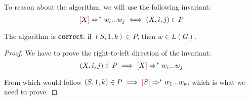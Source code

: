 \documentclass[main.tex]{subfiles}
\begin{document}
To reason about the algorithm, we will use the following invariant:
\begin{equation}
    \textcolor{red}{[} X \textcolor{red}{]} \Rightarrow^* w_i ... w_j \iff (X, i, j) \in P
\end{equation}

\begin{prop}
    The algorithm is \textbf{correct}: if $(S, 1, k) \in P$, then $w \in L(G)$.
\end{prop}
\begin{proof}
    We have to prove the right-to-left direction of the invariant:
    \begin{equation}\label{eq:left}
        (X, i, j) \in P \implies \textcolor{red}{[} X \textcolor{red}{]} \Rightarrow^* w_i ... w_j
    \end{equation}

    From which would follow $ (S, 1, k) \in P \implies \textcolor{red}{[} S \textcolor{red}{]} \Rightarrow^* w_1 ... w_k$,
    which is what we need to prove.


\end{proof}
\end{document}
